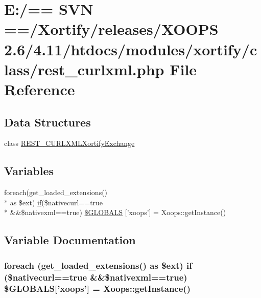 \hypertarget{rest__curlxml_8php}{\section{E\-:/== S\-V\-N ==/\-Xortify/releases/\-X\-O\-O\-P\-S 2.6/4.11/htdocs/modules/xortify/class/rest\-\_\-curlxml.php File Reference}
\label{rest__curlxml_8php}
}
\subsection*{Data Structures}
\begin{DoxyCompactItemize}
\item 
class \hyperlink{class_r_e_s_t___c_u_r_l_x_m_l_xortify_exchange}{R\-E\-S\-T\-\_\-\-C\-U\-R\-L\-X\-M\-L\-Xortify\-Exchange}
\end{DoxyCompactItemize}
\subsection*{Variables}
\begin{DoxyCompactItemize}
\item 
foreach(get\-\_\-loaded\-\_\-extensions() \\*
as \$ext) \hyperlink{poll_2index_8php_ae404acbb304be6b6ac443de921697faf}{if}(\$nativecurl==true \\*
\&\&\$nativexml==true) \hyperlink{rest__curlxml_8php_ada6200c7fa12b633a7d6f6f54ff17e13}{\$\-G\-L\-O\-B\-A\-L\-S} \mbox{[}'xoops'\mbox{]} = Xoops\-::get\-Instance()
\end{DoxyCompactItemize}


\subsection{Variable Documentation}
\hypertarget{rest__curlxml_8php_ada6200c7fa12b633a7d6f6f54ff17e13}{
\subsubsection[{\$\-G\-L\-O\-B\-A\-L\-S}]{\setlength{\rightskip}{0pt plus 5cm}foreach (get\-\_\-loaded\-\_\-extensions() as \$ext) {\bf if} (\$nativecurl==true \&\&\$nativexml==true) \$G\-L\-O\-B\-A\-L\-S\mbox{[}'xoops'\mbox{]} = Xoops\-::get\-Instance()}}\label{rest__curlxml_8php_ada6200c7fa12b633a7d6f6f54ff17e13}
